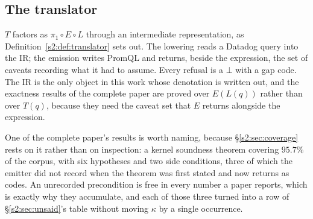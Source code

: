 \subsection{The translator}

$T$ factors as $\pi_1\circ E\circ L$ through an intermediate representation, as
Definition~\ref{s2:def:translator} sets out. The lowering reads a Datadog query into the
IR; the emission writes PromQL and returns, beside the expression, the set of caveats
recording what it had to assume. Every refusal is a $\bot$ with a gap code. The IR is the
only object in this work whose denotation is written out, and the exactness results of the
complete paper are proved over $E(L(q))$ rather than over $T(q)$, because they need the
caveat set that $E$ returns alongside the expression.

One of the complete paper's results is worth naming, because \S\ref{s2:sec:coverage} rests
on it rather than on inspection: a kernel soundness theorem covering $95.7\%$ of the
corpus, with six hypotheses and two side conditions, three of which the emitter did not
record when the theorem was first stated and now returns as codes. An unrecorded
precondition is free in every number a paper reports, which is exactly why they accumulate,
and each of those three turned into a row of \S\ref{s2:sec:unsaid}'s table without moving
$\kappa$ by a single occurrence.
